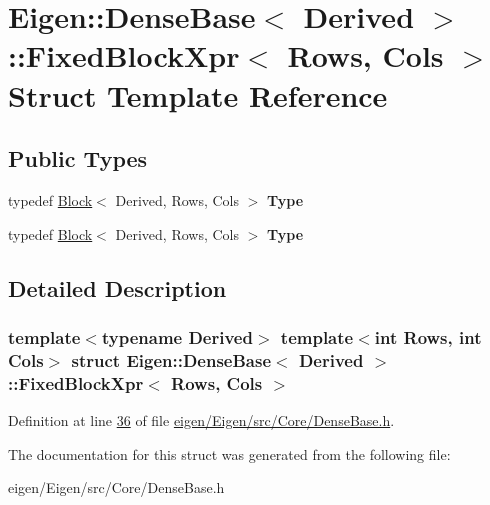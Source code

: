 \hypertarget{struct_eigen_1_1_dense_base_1_1_fixed_block_xpr}{}\section{Eigen\+:\+:Dense\+Base$<$ Derived $>$\+:\+:Fixed\+Block\+Xpr$<$ Rows, Cols $>$ Struct Template Reference}
\label{struct_eigen_1_1_dense_base_1_1_fixed_block_xpr}
\subsection*{Public Types}
\begin{DoxyCompactItemize}
\item 
\mbox{\label{struct_eigen_1_1_dense_base_1_1_fixed_block_xpr_a8ee33f171398a376aed84460e3a8cb96}} 
typedef \hyperlink{group___core___module_class_eigen_1_1_block}{Block}$<$ Derived, Rows, Cols $>$ {\bfseries Type}
\item 
\mbox{\label{struct_eigen_1_1_dense_base_1_1_fixed_block_xpr_a8ee33f171398a376aed84460e3a8cb96}} 
typedef \hyperlink{group___core___module_class_eigen_1_1_block}{Block}$<$ Derived, Rows, Cols $>$ {\bfseries Type}
\end{DoxyCompactItemize}


\subsection{Detailed Description}
\subsubsection*{template$<$typename Derived$>$\newline
template$<$int Rows, int Cols$>$\newline
struct Eigen\+::\+Dense\+Base$<$ Derived $>$\+::\+Fixed\+Block\+Xpr$<$ Rows, Cols $>$}



Definition at line \hyperlink{eigen_2_eigen_2src_2_core_2_dense_base_8h_source_l00036}{36} of file \hyperlink{eigen_2_eigen_2src_2_core_2_dense_base_8h_source}{eigen/\+Eigen/src/\+Core/\+Dense\+Base.\+h}.



The documentation for this struct was generated from the following file\+:\begin{DoxyCompactItemize}
\item 
eigen/\+Eigen/src/\+Core/\+Dense\+Base.\+h\end{DoxyCompactItemize}
